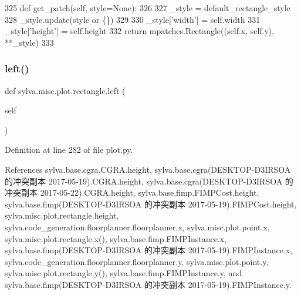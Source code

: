 \begin{DoxyCode}
325         \textcolor{keyword}{def }get\_patch(self, style=None):
326 
327             \_style = default\_rectangle\_style
328             \_style.update(style \textcolor{keywordflow}{or} \{\})
329 
330             \_style[\textcolor{stringliteral}{'width'}] = self.width
331             \_style[\textcolor{stringliteral}{'height'}] = self.height
332             \textcolor{keywordflow}{return} mpatches.Rectangle((self.x, self.y), **\_style)
333 
\end{DoxyCode}
\mbox{\label{classsylva_1_1misc_1_1plot_1_1rectangle_a4080bf5f63cc48132e480b458369af41}} 
\subsubsection{\texorpdfstring{left()}{left()}}
{\footnotesize\ttfamily def sylva.\+misc.\+plot.\+rectangle.\+left (\begin{DoxyParamCaption}\item[{}]{self }\end{DoxyParamCaption})}



Definition at line 282 of file plot.\+py.



References sylva.\+base.\+cgra.\+C\+G\+R\+A.\+height, sylva.\+base.\+cgra(\+D\+E\+S\+K\+T\+O\+P-\/\+D3\+I\+R\+S\+O\+A 的冲突副本 2017-\/05-\/19).\+C\+G\+R\+A.\+height, sylva.\+base.\+cgra(\+D\+E\+S\+K\+T\+O\+P-\/\+D3\+I\+R\+S\+O\+A 的冲突副本 2017-\/05-\/22).\+C\+G\+R\+A.\+height, sylva.\+base.\+fimp.\+F\+I\+M\+P\+Cost.\+height, sylva.\+base.\+fimp(\+D\+E\+S\+K\+T\+O\+P-\/\+D3\+I\+R\+S\+O\+A 的冲突副本 2017-\/05-\/19).\+F\+I\+M\+P\+Cost.\+height, sylva.\+misc.\+plot.\+rectangle.\+height, sylva.\+code\+\_\+generation.\+floorplanner.\+floorplanner.\+x, sylva.\+misc.\+plot.\+point.\+x, sylva.\+misc.\+plot.\+rectangle.\+x(), sylva.\+base.\+fimp.\+F\+I\+M\+P\+Instance.\+x, sylva.\+base.\+fimp(\+D\+E\+S\+K\+T\+O\+P-\/\+D3\+I\+R\+S\+O\+A 的冲突副本 2017-\/05-\/19).\+F\+I\+M\+P\+Instance.\+x, sylva.\+code\+\_\+generation.\+floorplanner.\+floorplanner.\+y, sylva.\+misc.\+plot.\+point.\+y, sylva.\+misc.\+plot.\+rectangle.\+y(), sylva.\+base.\+fimp.\+F\+I\+M\+P\+Instance.\+y, and sylva.\+base.\+fimp(\+D\+E\+S\+K\+T\+O\+P-\/\+D3\+I\+R\+S\+O\+A 的冲突副本 2017-\/05-\/19).\+F\+I\+M\+P\+Instance.\+y.



